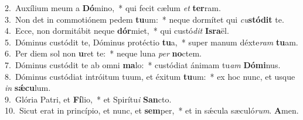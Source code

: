 {2.~}Auxílium meum a \textbf{Dó}mino,~* qui fecit cælum \textit{et} \textbf{ter}ram.\\
{3.~}Non det in commotiónem pedem \textbf{tu}um:~* neque dormítet qui \textit{cu}\textbf{stó}\textbf{dit} te.\\
{4.~}Ecce, non dormitábit neque \textbf{dór}miet,~* qui custó\textit{dit} \textbf{Is}\textbf{ra}ël.\\
{5.~}Dóminus custódit te, Dóminus protéctio \textbf{tu}a,~* super manum déxte\textit{ram} \textbf{tu}am.\\
{6.~}Per diem sol non \textbf{u}ret te:~* neque luna \textit{per} \textbf{no}ctem.\\
{7.~}Dóminus custódit te ab omni \textbf{ma}lo:~* custódiat ánimam tu\textit{am} \textbf{Dó}\textbf{mi}nus.\\
{8.~}Dóminus custódiat intróitum tuum, et éxitum \textbf{tu}um:~* ex hoc nunc, et usque \textit{in} \textbf{sǽ}\textbf{cu}lum.\\
{9.~}Glória Patri, et \textbf{Fí}lio,~* et Spirítu\textit{i} \textbf{San}cto.\\
{10.~}Sicut erat in princípio, et nunc, et \textbf{sem}per,~* et in sǽcula sæculó\textit{rum}. \textbf{A}men.\\

